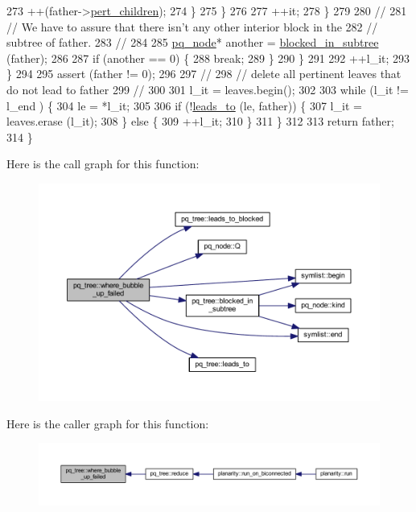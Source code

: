 \begin{DoxyCode}
273             ++(father->\mbox{\hyperlink{classpq__node_a8d8fb7b3059e7aeecf62eeed34076afb}{pert\_children}});
274             \}
275         \}
276         
277         ++it;
278         \}
279 
280         \textcolor{comment}{//}
281         \textcolor{comment}{// We have to assure that there isn't any other interior block in the}
282         \textcolor{comment}{// subtree of father. }
283         \textcolor{comment}{//}
284 
285         \mbox{\hyperlink{classpq__node}{pq\_node}}* another = \mbox{\hyperlink{classpq__tree_a6ce932de3106ad6c9d84bb2058784b0a}{blocked\_in\_subtree}} (father);
286         
287         \textcolor{keywordflow}{if} (another == 0) \{
288         \textcolor{keywordflow}{break};
289         \}
290     \}
291     
292     ++l\_it;
293     \}
294 
295     assert (father != 0);
296 
297     \textcolor{comment}{//}
298     \textcolor{comment}{// delete all pertinent leaves that do not lead to father}
299     \textcolor{comment}{//}
300 
301     l\_it = leaves.begin();
302 
303     \textcolor{keywordflow}{while} (l\_it != l\_end ) \{
304     le = *l\_it;
305 
306     \textcolor{keywordflow}{if} (!\mbox{\hyperlink{classpq__tree_aa2c33ce6225a761119a1ea00b91753db}{leads\_to}} (le, father)) \{
307         l\_it = leaves.erase (l\_it);
308     \} \textcolor{keywordflow}{else} \{
309         ++l\_it;
310     \}
311     \}
312 
313     \textcolor{keywordflow}{return} father;
314 \}
\end{DoxyCode}
Here is the call graph for this function\+:\nopagebreak
\begin{figure}[H]
\begin{center}
\leavevmode
\includegraphics[width=350pt]{classpq__tree_a5b394c87bfa938f388b847f0040c2940_cgraph}
\end{center}
\end{figure}
Here is the caller graph for this function\+:\nopagebreak
\begin{figure}[H]
\begin{center}
\leavevmode
\includegraphics[width=350pt]{classpq__tree_a5b394c87bfa938f388b847f0040c2940_icgraph}
\end{center}
\end{figure}


